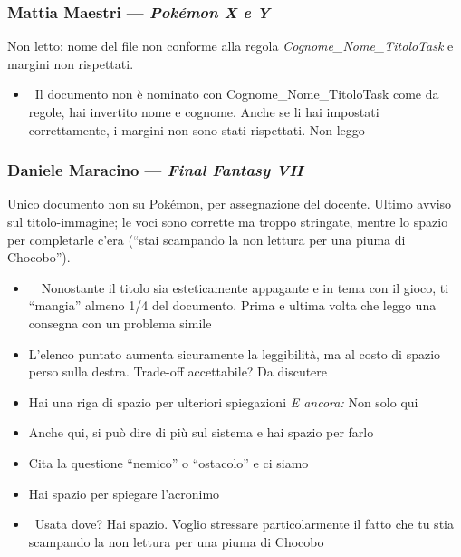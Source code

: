 \subsubsection{Mattia Maestri --- \emph{Pokémon X e Y}}
Non letto: nome del file non conforme alla regola
\emph{Cognome\_\allowbreak Nome\_\allowbreak TitoloTask} e margini non rispettati.
{\small
\begin{itemize}
  \item {} \rvAvviso\ Il documento non è nominato con Cognome\_\allowbreak Nome\_\allowbreak TitoloTask come da regole, hai invertito nome e cognome. Anche se li hai impostati correttamente, i margini non sono stati rispettati. Non leggo
\end{itemize}
}

\subsubsection{Daniele Maracino --- \emph{Final Fantasy VII}}
Unico documento non su Pokémon, per assegnazione del docente. Ultimo avviso
sul titolo-immagine; le voci sono corrette ma troppo stringate, mentre lo
spazio per completarle c'era (``stai scampando la non lettura per una piuma di
Chocobo'').
{\small
\begin{itemize}
  \item \rvVuoto\ \rvAvviso\ Nonostante il titolo sia esteticamente appagante e in tema con il gioco, ti ``mangia'' almeno 1/4 del documento. Prima e ultima volta che leggo una consegna con un problema simile
  \item {} L'elenco puntato aumenta sicuramente la leggibilità, ma al costo di spazio perso sulla destra. Trade-off accettabile? Da discutere
  \item {} Hai una riga di spazio per ulteriori spiegazioni \emph{E ancora:} Non solo qui
  \item {} Anche qui, si può dire di più sul sistema e hai spazio per farlo
  \item {} Cita la questione ``nemico'' o ``ostacolo'' e ci siamo
  \item {} Hai spazio per spiegare l'acronimo
  \item {} \rvAvviso\ Usata dove? Hai spazio. Voglio stressare particolarmente il fatto che tu stia scampando la non lettura per una piuma di Chocobo
\end{itemize}
}

